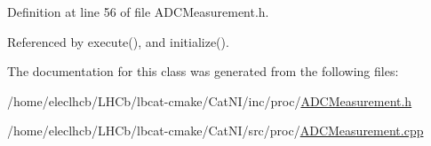 Definition at line 56 of file ADCMeasurement.h.

Referenced by execute(), and initialize().

The documentation for this class was generated from the following files:\begin{DoxyCompactItemize}
\item 
/home/eleclhcb/LHCb/lbcat-\/cmake/CatNI/inc/proc/\hyperlink{ADCMeasurement_8h}{ADCMeasurement.h}\item 
/home/eleclhcb/LHCb/lbcat-\/cmake/CatNI/src/proc/\hyperlink{ADCMeasurement_8cpp}{ADCMeasurement.cpp}\end{DoxyCompactItemize}
